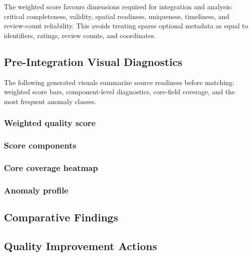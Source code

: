 \documentclass[11pt,a4paper]{article}
\begin{document}
The weighted score favours dimensions required for integration and analysis:
critical completeness, validity, spatial readiness, uniqueness, timeliness, and
review-count reliability. This avoids treating sparse optional metadata as equal
to identifiers, ratings, review counts, and coordinates.



\subsection{Pre-Integration Visual Diagnostics}

The following generated visuals summarize source readiness before matching:
weighted score bars, component-level diagnostics, core-field coverage, and the
most frequent anomaly classes.

\subsubsection*{Weighted quality score}


\subsubsection*{Score components}


\subsubsection*{Core coverage heatmap}


\subsubsection*{Anomaly profile}


\subsection{Comparative Findings}



\subsection{Quality Improvement Actions}


\end{document}
